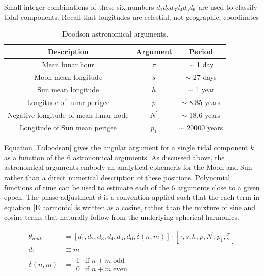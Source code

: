 \begin{table}[htp]
\caption{Doodson astronomical arguments.}
{Small integer combinations of these six numbers $d_1 d_2 d_3 d_4 d_5 d_6$ are used to classify tidal components.  Recall that longitudes are celestial, not geographic, coordinates}
\begin{center} 
\begin{tabular}{|c|c|c|}
\hline
Description                            & Argument          & Period\\
\hline
Mean lunar hour                        & $\tau$            & $\sim$ 1 day      \\
Moon mean longitude                    & $s$               & $\sim$ 27 days    \\  
Sun mean longitude                     & $h$               & $\sim$ 1 year     \\
Longitude of lunar perigee             & $p$               & $\sim$ 8.85 years \\
Negative longitude of mean lunar node  & $N^\prime$        & $\sim$ 18.6 years \\
Longitude of Sun mean perigee          & $p_1$             & $\sim$ 20000 years\\
\hline
\end{tabular} 
\end{center}
\label{T:doodson}
\end{table}


Equation \ref{E:doodson} gives the angular argument for a single tidal component $k$ as a function of the 6 astronomical arguments.   As discussed above, the astronomical arguments embody an analytical ephemeris for the Moon and Sun rather than a direct numerical description of these positions.  Polynomial functions of time can be used to estimate each of the 6 arguments close to a given epoch.  The phase adjustment $\delta$ is a convention applied such that the each term in equation \ref{E:harmonic} is written as a cosine, rather than the mixture of sine and cosine terms that naturally follow from the underlying spherical harmonics.

\begin{align}
    \label{E:doodson}
    \theta_{nmk}  &= \left[d_1, d_2, d_3, d_4, d_5, d_6, \delta(n,m) \right] \cdot \left[\tau, s, h, p, N^\prime, p_1, \frac{\pi}{2}   \right]   \nonumber \\
          d_1 &\equiv m \nonumber\\
    \delta(n,m) &=  \begin{array}{ll}
                    1 & \mbox{if $n+m$ odd}  \\
                    0 & \mbox{if $n+m$ even} 
                    \end{array}             
\end{align} 

